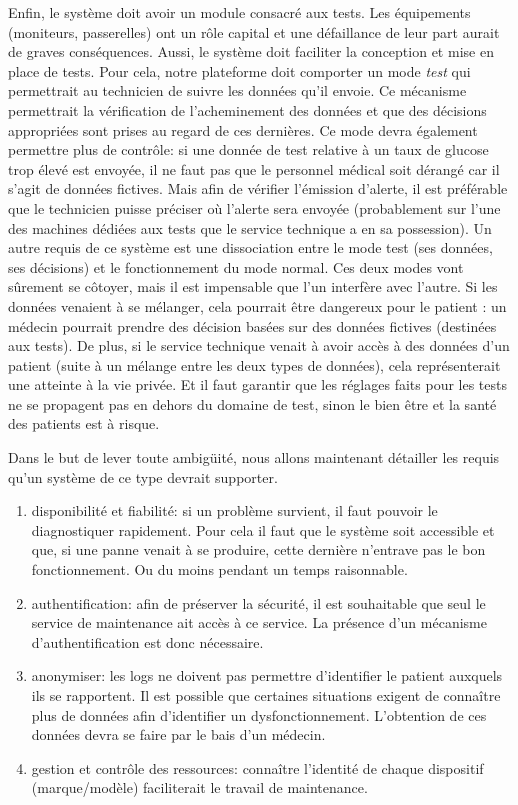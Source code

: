 Enfin, le système doit avoir un module consacré aux tests. Les équipements (moniteurs, passerelles) ont un rôle capital et une
défaillance de leur part aurait de graves conséquences. Aussi, le système doit faciliter la conception et mise en place de tests.
Pour cela, notre plateforme doit comporter un mode \textit{test} qui permettrait au technicien de suivre les données qu'il envoie.
Ce mécanisme permettrait la vérification de l'acheminement des données et que des décisions appropriées sont prises au regard de
ces dernières. Ce mode devra également permettre plus de contrôle: si une donnée de test relative à un taux de glucose trop élevé
est envoyée, il ne faut pas que le personnel médical soit dérangé car il s'agit de données fictives. Mais afin de vérifier
l'émission d'alerte, il est préférable que le technicien puisse préciser où l'alerte sera envoyée (probablement sur l'une des
machines dédiées aux tests que le service technique a en sa possession). Un autre requis de ce système est une dissociation entre
le mode test (ses données, ses décisions) et le fonctionnement du mode normal. Ces deux modes vont sûrement se côtoyer, mais il
est impensable que l'un interfère avec l'autre. Si les données venaient à se mélanger, cela pourrait être dangereux pour le
patient : un médecin pourrait prendre des décision basées sur des données fictives (destinées aux tests). De plus, si le service
technique venait à avoir accès à des données d'un patient (suite à un mélange entre les deux types de données), cela
représenterait une atteinte à la vie privée. Et il faut garantir que les réglages faits pour les tests ne se propagent pas en dehors
du domaine de test, sinon le bien être et la santé des patients est à risque.
\newline

Dans le but de lever toute ambigüité, nous allons maintenant détailler les requis qu'un système de ce type devrait supporter.
\begin{enumerate}
    \item disponibilité et fiabilité: si un problème survient, il faut pouvoir le diagnostiquer rapidement. Pour cela il faut que le
    système soit accessible et que, si une panne venait à se produire, cette dernière n'entrave pas le bon fonctionnement. Ou du
    moins pendant un temps raisonnable.
    \item authentification: afin de préserver la sécurité, il est souhaitable que seul le service de maintenance ait accès à ce
    service. La présence d'un mécanisme d'authentification est donc nécessaire.
    \item anonymiser: les logs ne doivent pas permettre d'identifier le patient auxquels ils se rapportent. Il est possible que
    certaines situations exigent de connaître plus de données afin d'identifier un dysfonctionnement. L'obtention de ces données
    devra se faire par le bais d'un médecin.
    \item gestion et contrôle des ressources: connaître l'identité de chaque dispositif (marque/modèle) faciliterait le travail de
    maintenance.
\end{enumerate}
